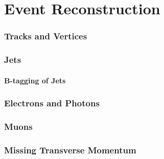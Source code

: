 \chapter{Event Reconstruction}
\label{sec:event:reco}

\subsection{Tracks and Vertices}
\label{sec:reco:tracks}

\subsection{Jets}

\subsubsection{B-tagging of Jets}

\subsection{Electrons and Photons}

\subsection{Muons}

\subsection{Missing Transverse Momentum}
